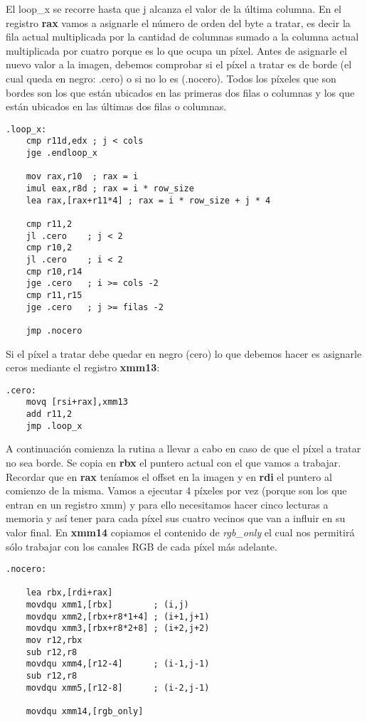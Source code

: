 \documentclass[a4paper]{article}
\begin{document}
\indent El loop_x se recorre hasta que j alcanza el valor de la \'ultima columna. En el registro \textbf{rax} vamos a asignarle el n\'umero de orden del byte a tratar, es decir la fila actual multiplicada por la cantidad de columnas sumado a la columna actual multiplicada por cuatro porque es lo que ocupa un p\'ixel. 
Antes de asignarle el nuevo valor a la imagen, debemos comprobar si el p\'ixel a tratar es de borde (el cual queda en negro: .cero) o si no lo es (.nocero). Todos los p\'ixeles que son bordes son los que est\'an ubicados en las primeras dos filas o columnas y los que est\'an ubicados en las \'ultimas dos filas o columnas.
 \begin{codesnippet}
\begin{verbatim}
.loop_x:
    cmp r11d,edx ; j < cols 
    jge .endloop_x

    mov rax,r10  ; rax = i
    imul eax,r8d ; rax = i * row_size 
    lea rax,[rax+r11*4] ; rax = i * row_size + j * 4

    cmp r11,2   
    jl .cero    ; j < 2
    cmp r10,2 
    jl .cero    ; i < 2
    cmp r10,r14
    jge .cero   ; i >= cols -2
    cmp r11,r15
    jge .cero   ; j >= filas -2

    jmp .nocero
\end{verbatim}
\end{codesnippet}

\newpage
\indent Si el p\'ixel a tratar debe quedar en negro (cero) lo que debemos hacer es asignarle ceros mediante el registro \textbf{xmm13}:
 \begin{codesnippet}
\begin{verbatim}
.cero:
    movq [rsi+rax],xmm13        
    add r11,2
    jmp .loop_x
\end{verbatim}
\end{codesnippet}

A continuaci\'on comienza la rutina a llevar a cabo en caso de que el p\'ixel a tratar no sea borde. Se copia en \textbf{rbx} el puntero actual con el que vamos a trabajar. Recordar que en \textbf{rax} ten\'iamos el offset en la imagen y en \textbf{rdi} el puntero al comienzo de la misma. Vamos a ejecutar 4 p\'ixeles por vez (porque son los que entran en un registro xmm) y para ello necesitamos hacer cinco lecturas a memoria y as\'i tener para cada p\'ixel sus cuatro vecinos que van a influir en su valor final. En \textbf{xmm14} copiamos el contenido de \textit{rgb_only} el cual nos permitir\'a s\'olo trabajar con los canales RGB de cada p\'ixel m\'as adelante.
 \begin{codesnippet}
\begin{verbatim}
.nocero:
    
    lea rbx,[rdi+rax]
    movdqu xmm1,[rbx]        ; (i,j)
    movdqu xmm2,[rbx+r8*1+4] ; (i+1,j+1)
    movdqu xmm3,[rbx+r8*2+8] ; (i+2,j+2)
    mov r12,rbx
    sub r12,r8
    movdqu xmm4,[r12-4]      ; (i-1,j-1)
    sub r12,r8
    movdqu xmm5,[r12-8]      ; (i-2,j-1)

    movdqu xmm14,[rgb_only]
\end{verbatim}
\end{codesnippet}
\end{document}
